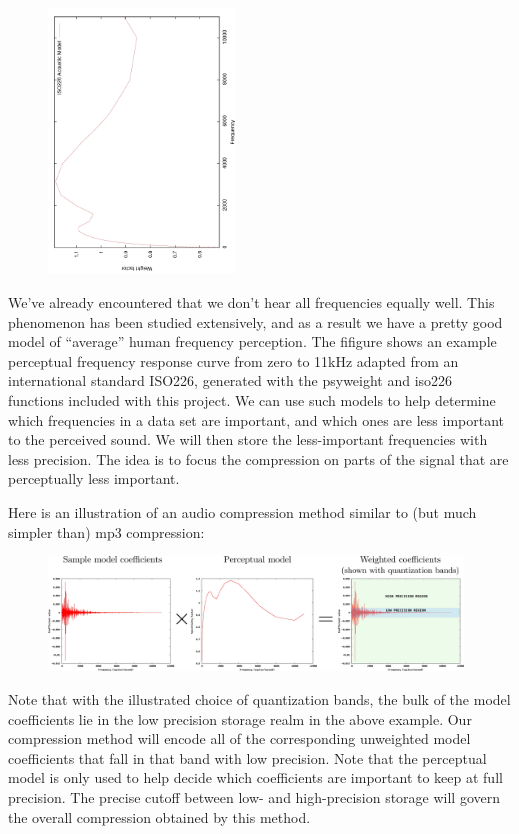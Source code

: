 \documentclass[10pt]{article}
\begin{document}
\begin{figure}
  \begin{center}
  \vspace{-30pt}
\includegraphics[angle=270,width=0.44\textwidth]{fig3}
  \end{center}
  \vspace{-20pt}
\end{figure}
We've already encountered that we don't hear all frequencies
equally well. This phenomenon has been studied extensively, and as
a result we have a pretty good model of ``average'' human frequency
perception. 
The ﬁfigure shows an example perceptual
frequency response curve from zero to 11kHz 
adapted from an international standard ISO226, 
generated with the psyweight and iso226 functions included with this project. 
We can use such models to help determine which frequencies
in a data set are important, and which ones are less important to the 
perceived sound.
We will then store the less-important frequencies with less precision.
The idea is to focus the compression on parts of the signal that are
perceptually less important.

Here is an illustration of an audio compression method similar to
(but much simpler than) mp3 compression:
\begin{figure}[h!]
\begin{center}
\includegraphics[width=0.98\textwidth]{fig4}
\end{center}
\end{figure}
Note that with the illustrated choice of quantization bands, the bulk of
the model coefficients lie in the low precision storage realm in the 
above example. Our compression method will encode all of the corresponding
unweighted model coefficients that fall in that band with low precision.
Note that the perceptual model is only used to help decide which coefficients
are important to keep at full precision. The precise cutoff between low-
and high-precision storage will govern the overall compression obtained
by this method.
\end{document}
